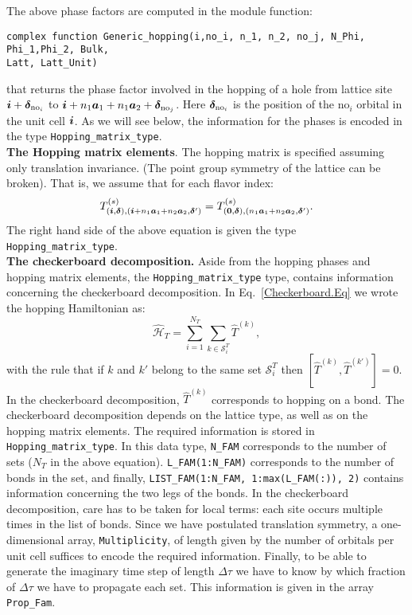 The above phase factors are computed  in the   module function: 
\begin{lstlisting}[style=fortran]
complex function Generic_hopping(i,no_i, n_1, n_2, no_j, N_Phi, Phi_1,Phi_2, Bulk, 
Latt, Latt_Unit)
\end{lstlisting}
that  returns the  phase factor involved in the hopping of a hole from lattice site $ \boldsymbol{i} + \boldsymbol{\delta}_{\text{no}_i} $ to 
$\boldsymbol{i} + n_1 \boldsymbol{a}_1 + n_1 \boldsymbol{a}_2+ \boldsymbol{\delta}_{\text{no}_j}  $.  Here  $\boldsymbol{\delta}_{\text{no}_i}$  is  the position of the $\text{no}_i$  orbital in the unit cell
$\boldsymbol{i}$. 
As  we will see below, the information for the phases is encoded in  the type \texttt{Hopping\_matrix\_type}.\\

\noindent
\textbf{The  Hopping matrix elements}. 
The hopping matrix  is specified assuming only translation invariance.  (The point group symmetry of the lattice can be broken).    That is, we assume that  for  each flavor index: 
\begin{equation} 
T_{(\boldsymbol{i},\boldsymbol{\delta}), (\boldsymbol{i} +  n_1\boldsymbol{a}_1  + n_2 \boldsymbol{a}_2,\boldsymbol{\delta}')}^{(s)}   =   T^{(s)}_{(\boldsymbol{0},\boldsymbol{\delta}),  (n_1\boldsymbol{a}_1  + n_2 \boldsymbol{a}_2,\boldsymbol{\delta}') }.
\label{Hop.eq}	 
\end{equation}
The right  hand side of the above equation is given  the type  \texttt{Hopping\_matrix\_type}.\\


\noindent
\textbf{The checkerboard decomposition.}   Aside from the hopping phases and hopping matrix elements, the \texttt{Hopping\_matrix\_type} type, contains information  concerning the checkerboard   decomposition.  In Eq.~\ref{Checkerboard.Eq} we wrote the hopping Hamiltonian as:
\begin{equation}
\hat{\mathcal{H}}_{T}     = \sum_{i=1}^{N_T} \sum_{k \in \mathcal{S}^{T}_i} \hat{T}^{(k)},  
\end{equation}
with the rule that  if $k$ and $k'$  belong to the same set $\mathcal{S}^{T}_i $ then   $ \left[ \hat{T}^{(k)} , \hat{T}^{(k')} \right] = 0 $.  In the checkerboard decomposition, $\hat{T}^{(k)}$   corresponds to  hopping on a bond.    The checkerboard decomposition depends on the   lattice type, as well as on the hopping matrix elements.   The required  information is stored in  \texttt{Hopping\_matrix\_type}. In this data type,  \texttt{N\_FAM}  corresponds to the number of sets  ($N_T$ in the above equation). \texttt{L\_FAM(1:N\_FAM)}   corresponds to the number of bonds in the set,  and finally,  \texttt{LIST\_FAM(1:N\_FAM, 1:max(L\_FAM(:)), 2)}    contains  information concerning the two legs of the bonds.    In the checkerboard decomposition, care has to be taken for local terms: each site  occurs multiple times in the list of bonds.    Since we have postulated translation symmetry,    a one-dimensional array, \texttt{Multiplicity},  of length  given by  the number of orbitals per unit cell suffices to  encode the required information.  
Finally, to be able to generate  the imaginary time step of length $\Delta \tau$  we  have to know   by which fraction of  $\Delta \tau$   we have to propagate each set.  This information is given in  the array  \texttt{Prop\_Fam}.  



